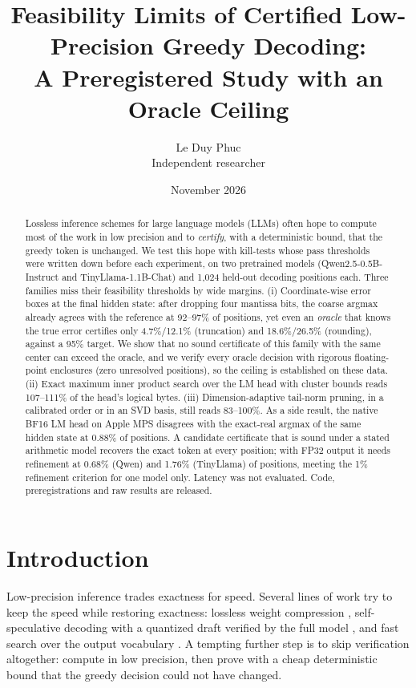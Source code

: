 \documentclass[11pt]{article}
\title{Feasibility Limits of Certified Low-Precision Greedy Decoding:\\
A Preregistered Study with an Oracle Ceiling}
\author{Le Duy Phuc\\Independent researcher}
\date{November 2026}
\theoremstyle{definition}
\begin{document}
\maketitle

\begin{abstract}
Lossless inference schemes for large language models (LLMs) often hope to compute
most of the work in low precision and to \emph{certify}, with a deterministic bound,
that the greedy token is unchanged. We test this hope with kill-tests whose pass
thresholds were written down before each experiment, on two pretrained models
(Qwen2.5-0.5B-Instruct and TinyLlama-1.1B-Chat) and 1{,}024 held-out decoding
positions each. Three families miss their feasibility thresholds by wide margins.
(i) Coordinate-wise error boxes at the final hidden state: after dropping four
mantissa bits, the coarse argmax already agrees with the reference at 92--97\% of
positions, yet even an \emph{oracle} that knows the true error certifies only
4.7\%/12.1\% (truncation) and 18.6\%/26.5\% (rounding), against a 95\% target. We
show that no sound certificate of this family with the same center can exceed the
oracle, and we verify every oracle decision with rigorous floating-point
enclosures (zero unresolved positions), so the ceiling is established on these
data. (ii) Exact maximum inner product search over the LM head with cluster bounds
reads 107--111\% of the head's logical bytes. (iii) Dimension-adaptive tail-norm
pruning, in a calibrated order or in an SVD basis, still reads 83--100\%. As a side
result, the native BF16 LM head on Apple MPS disagrees with the exact-real argmax
of the same hidden state at 0.88\% of positions. A candidate certificate that is
sound under a stated arithmetic model recovers the exact token at every position;
with FP32 output it needs refinement at 0.68\% (Qwen) and 1.76\% (TinyLlama) of
positions, meeting the 1\% refinement criterion for one model only. Latency was
not evaluated. Code, preregistrations and raw results are released.
\end{abstract}

\section{Introduction}
Low-precision inference trades exactness for speed. Several lines of work try to
keep the speed while restoring exactness: lossless weight compression
\cite{zhang2025dfloat11,hershcovitch2025zipnn}, self-speculative decoding with a
quantized draft verified by the full model
\cite{zhao2025qspec,tiwari2025quantspec,zhao2025speq}, and fast search over the
output vocabulary \cite{loretz2026output}. A tempting further step is to skip
verification altogether: compute in low precision, then prove with a cheap
deterministic bound that the greedy decision could not have changed.
\end{document}
